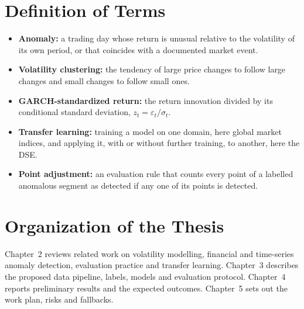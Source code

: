 \section{Definition of Terms}
\begin{itemize}
    \item \textbf{Anomaly:} a trading day whose return is unusual relative to the
    volatility of its own period, or that coincides with a documented market event.
    \item \textbf{Volatility clustering:} the tendency of large price changes to follow
    large changes and small changes to follow small ones.
    \item \textbf{GARCH-standardized return:} the return innovation divided by its
    conditional standard deviation, $z_t = \varepsilon_t / \sigma_t$.
    \item \textbf{Transfer learning:} training a model on one domain, here global market
    indices, and applying it, with or without further training, to another, here the DSE.
    \item \textbf{Point adjustment:} an evaluation rule that counts every point of a
    labelled anomalous segment as detected if any one of its points is detected.
\end{itemize}

\section{Organization of the Thesis}
Chapter~2 reviews related work on volatility modelling, financial and time-series anomaly
detection, evaluation practice and transfer learning. Chapter~3 describes the proposed data
pipeline, labels, models and evaluation protocol. Chapter~4 reports preliminary results and
the expected outcomes. Chapter~5 sets out the work plan, risks and fallbacks.
